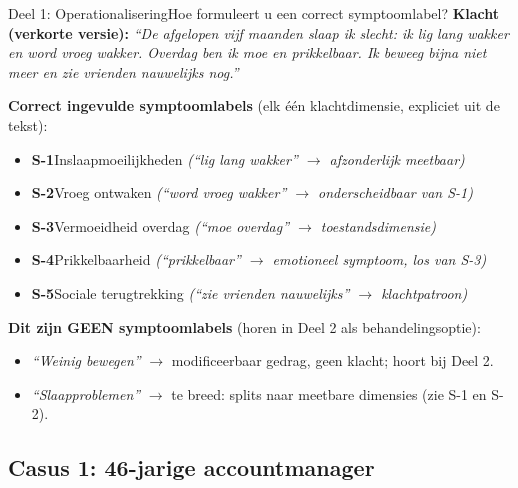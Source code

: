 \documentclass[11pt,a4paper]{article}
\begin{document}
\vspace{0.5em}
\nopagebreak[4]

\begin{voorbeeldbox}{Deel 1: Operationalisering}{Hoe formuleert u een correct symptoomlabel?}
\small
\textbf{Klacht (verkorte versie):} \textit{``De afgelopen vijf maanden slaap ik slecht:
ik lig lang wakker en word vroeg wakker. Overdag ben ik moe en prikkelbaar. Ik beweeg
bijna niet meer en zie vrienden nauwelijks nog.''}

\medskip
\textbf{Correct ingevulde symptoomlabels} (elk één klachtdimensie, expliciet uit de tekst):
\begin{itemize}[topsep=2pt,itemsep=1pt]
\item \textbf{S-1}\enspace Inslaapmoeilijkheden
  \hfill\textit{(``lig lang wakker'' $\rightarrow$ afzonderlijk meetbaar)}
\item \textbf{S-2}\enspace Vroeg ontwaken
  \hfill\textit{(``word vroeg wakker'' $\rightarrow$ onderscheidbaar van S-1)}
\item \textbf{S-3}\enspace Vermoeidheid overdag
  \hfill\textit{(``moe overdag'' $\rightarrow$ toestandsdimensie)}
\item \textbf{S-4}\enspace Prikkelbaarheid
  \hfill\textit{(``prikkelbaar'' $\rightarrow$ emotioneel symptoom, los van S-3)}
\item \textbf{S-5}\enspace Sociale terugtrekking
  \hfill\textit{(``zie vrienden nauwelijks'' $\rightarrow$ klachtpatroon)}
\end{itemize}

\medskip
\textbf{\color{StrongRed}Dit zijn GEEN symptoomlabels} (horen in Deel 2 als behandelingsoptie):
\begin{itemize}[topsep=1pt,itemsep=0pt]
\item \textit{``Weinig bewegen''} $\rightarrow$ modificeerbaar gedrag, geen klacht; hoort bij Deel 2.
\item \textit{``Slaapproblemen''} $\rightarrow$ te breed: splits naar meetbare dimensies (zie S-1 en S-2).
\end{itemize}
\end{voorbeeldbox}

\vspace{0.5em}

\newpage

\subsection*{Casus 1: 46-jarige accountmanager}
\end{document}

